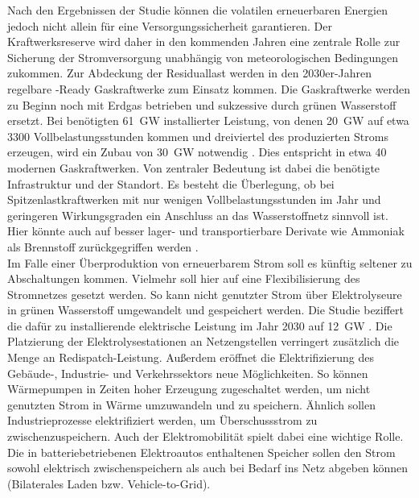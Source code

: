 		Nach den Ergebnissen der Studie können die volatilen erneuerbaren Energien jedoch nicht allein für eine Versorgungssicherheit garantieren. 
		Der Kraftwerksreserve wird daher in den kommenden Jahren eine zentrale Rolle zur Sicherung der Stromversorgung unabhängig von meteorologischen Bedingungen zukommen. 
		Zur Abdeckung der Residuallast werden in den 2030er-Jahren regelbare \Htwo-Ready Gaskraftwerke zum Einsatz kommen. 		 
		Die Gaskraftwerke werden zu Beginn noch mit Erdgas betrieben und sukzessive durch grünen Wasserstoff ersetzt. 
		Bei benötigten \SI{61}{\giga\watt} installierter Leistung, von denen \SI{20}{\giga\watt} auf etwa 3300 Vollbelastungsstunden kommen und dreiviertel des produzierten Stroms erzeugen, wird ein Zubau von \SI{30}{\giga\watt} notwendig \cite[S.9]{Agora_KlimaneutralesStromsystem}.  
		Dies entspricht in etwa 40 modernen Gaskraftwerken. 
		Von zentraler Bedeutung ist dabei die benötigte Infrastruktur und der Standort. 
		Es besteht die Überlegung, ob bei Spitzenlastkraftwerken mit nur wenigen Vollbelastungsstunden im Jahr und geringeren Wirkungsgraden ein Anschluss an das Wasserstoffnetz sinnvoll ist.
		Hier könnte auch auf besser lager- und transportierbare Derivate wie Ammoniak als Brennstoff zurückgegriffen werden \cite[S.17]{Agora_KlimaneutralesStromsystem}. \\
		
		
		Im Falle einer Überproduktion von erneuerbarem Strom soll es künftig seltener zu Abschaltungen kommen. 
		Vielmehr soll hier auf eine Flexibilisierung des Stromnetzes gesetzt werden.
		So kann nicht genutzter Strom über Elektrolyseure in grünen Wasserstoff umgewandelt und gespeichert werden. 
		Die Studie beziffert die dafür zu installierende elektrische Leistung im Jahr 2030 auf \SI{12}{\giga\watt} \cite[S.11]{Agora_KlimaneutralesStromsystem}.
		Die Platzierung der Elektrolysestationen an Netzengstellen verringert zusätzlich die Menge an Redispatch-Leistung. 
		Außerdem eröffnet die Elektrifizierung des Gebäude-, Industrie- und Verkehrssektors neue Möglichkeiten. 
		So können Wärmepumpen in Zeiten hoher Erzeugung zugeschaltet werden, um nicht genutzten Strom in Wärme umzuwandeln und zu speichern. 
		Ähnlich sollen Industrieprozesse elektrifiziert werden, um Überschussstrom zu zwischenzuspeichern. 
		Auch der Elektromobilität spielt dabei eine wichtige Rolle. 
		Die in batteriebetriebenen Elektroautos enthaltenen Speicher sollen den Strom sowohl elektrisch zwischenspeichern als auch bei Bedarf ins Netz abgeben können (Bilaterales Laden bzw. Vehicle-to-Grid). 
		
